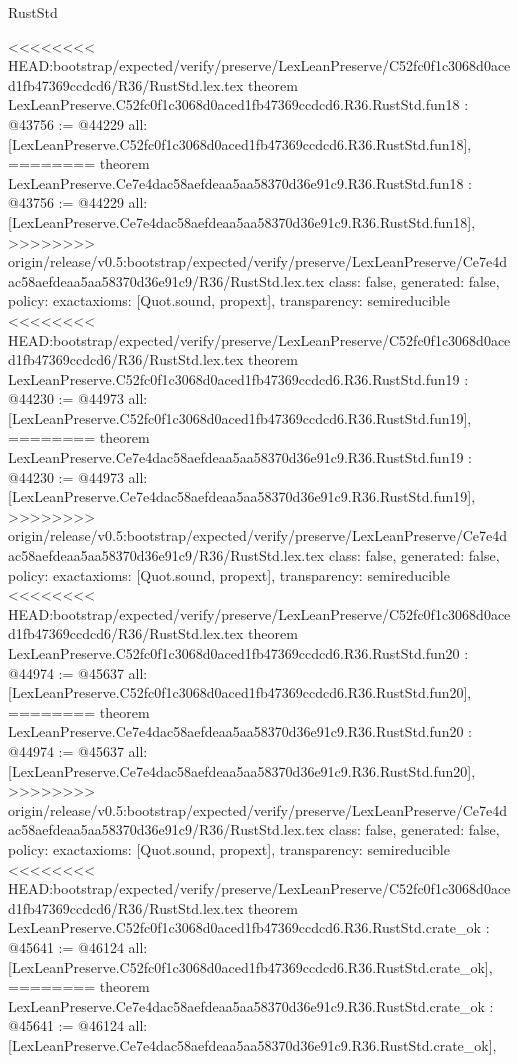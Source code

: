 \begin{lexlean}{RustStd}
\begin{coremodule}
{\begin{coremodule}
{{{{{{{{{{{{{{{{{{{{{}
<<<<<<<< HEAD:bootstrap/expected/verify/preserve/LexLeanPreserve/C52fc0f1c3068d0aced1fb47369ccdcd6/R36/RustStd.lex.tex
theorem LexLeanPreserve.C52fc0f1c3068d0aced1fb47369ccdcd6.R36.RustStd.fun18 : @43756 := @44229 {
  all: [LexLeanPreserve.C52fc0f1c3068d0aced1fb47369ccdcd6.R36.RustStd.fun18],
========
theorem LexLeanPreserve.Ce7e4dac58aefdeaa5aa58370d36e91c9.R36.RustStd.fun18 : @43756 := @44229 {
  all: [LexLeanPreserve.Ce7e4dac58aefdeaa5aa58370d36e91c9.R36.RustStd.fun18],
>>>>>>>> origin/release/v0.5:bootstrap/expected/verify/preserve/LexLeanPreserve/Ce7e4dac58aefdeaa5aa58370d36e91c9/R36/RustStd.lex.tex
  class: false,
  generated: false,
  policy: exact{axioms: [Quot.sound, propext]},
  transparency: semireducible
}
<<<<<<<< HEAD:bootstrap/expected/verify/preserve/LexLeanPreserve/C52fc0f1c3068d0aced1fb47369ccdcd6/R36/RustStd.lex.tex
theorem LexLeanPreserve.C52fc0f1c3068d0aced1fb47369ccdcd6.R36.RustStd.fun19 : @44230 := @44973 {
  all: [LexLeanPreserve.C52fc0f1c3068d0aced1fb47369ccdcd6.R36.RustStd.fun19],
========
theorem LexLeanPreserve.Ce7e4dac58aefdeaa5aa58370d36e91c9.R36.RustStd.fun19 : @44230 := @44973 {
  all: [LexLeanPreserve.Ce7e4dac58aefdeaa5aa58370d36e91c9.R36.RustStd.fun19],
>>>>>>>> origin/release/v0.5:bootstrap/expected/verify/preserve/LexLeanPreserve/Ce7e4dac58aefdeaa5aa58370d36e91c9/R36/RustStd.lex.tex
  class: false,
  generated: false,
  policy: exact{axioms: [Quot.sound, propext]},
  transparency: semireducible
}
<<<<<<<< HEAD:bootstrap/expected/verify/preserve/LexLeanPreserve/C52fc0f1c3068d0aced1fb47369ccdcd6/R36/RustStd.lex.tex
theorem LexLeanPreserve.C52fc0f1c3068d0aced1fb47369ccdcd6.R36.RustStd.fun20 : @44974 := @45637 {
  all: [LexLeanPreserve.C52fc0f1c3068d0aced1fb47369ccdcd6.R36.RustStd.fun20],
========
theorem LexLeanPreserve.Ce7e4dac58aefdeaa5aa58370d36e91c9.R36.RustStd.fun20 : @44974 := @45637 {
  all: [LexLeanPreserve.Ce7e4dac58aefdeaa5aa58370d36e91c9.R36.RustStd.fun20],
>>>>>>>> origin/release/v0.5:bootstrap/expected/verify/preserve/LexLeanPreserve/Ce7e4dac58aefdeaa5aa58370d36e91c9/R36/RustStd.lex.tex
  class: false,
  generated: false,
  policy: exact{axioms: [Quot.sound, propext]},
  transparency: semireducible
}
<<<<<<<< HEAD:bootstrap/expected/verify/preserve/LexLeanPreserve/C52fc0f1c3068d0aced1fb47369ccdcd6/R36/RustStd.lex.tex
theorem LexLeanPreserve.C52fc0f1c3068d0aced1fb47369ccdcd6.R36.RustStd.crate_ok : @45641 := @46124 {
  all: [LexLeanPreserve.C52fc0f1c3068d0aced1fb47369ccdcd6.R36.RustStd.crate_ok],
========
theorem LexLeanPreserve.Ce7e4dac58aefdeaa5aa58370d36e91c9.R36.RustStd.crate_ok : @45641 := @46124 {
  all: [LexLeanPreserve.Ce7e4dac58aefdeaa5aa58370d36e91c9.R36.RustStd.crate_ok],
}}}}}}}}}}}}}}}}}}}}}}}}}
\end{coremodule}}
\end{coremodule}
\end{lexlean}

